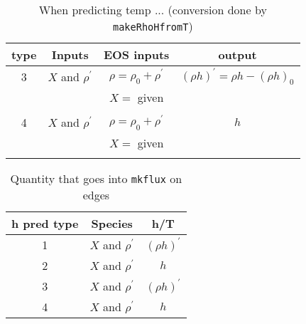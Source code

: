 \documentclass[11pt]{article}
\begin{document}
\begin{table*}
\begin{center}
\caption{When predicting temp ... (conversion done by {\tt makeRhoHfromT}) \newline}
\begin{tabular}{c|c|c|c}
\hline
\hline
{type} & {Inputs } & {EOS inputs} & {output} \\
\hline
3 & $X$ and $\rho^\prime$ & $\rho = \rho_0 + \rho^\prime$ &  $(\rho h)^\prime = \rho h - (\rho h)_0$ \\
   &                   & $   X = $ given & \\
   &                   &                 & \\
 4 & $X$ and $\rho^\prime$ & $\rho = \rho_0 + \rho^\prime$ & $h$ \\
   &                   & $   X = $ given & \\
   &                   &                 & \\
\hline
\end{tabular}
\end{center}
\end{table*}


\begin{table*}
\begin{center}
\caption{Quantity that goes into {\tt mkflux} on edges \newline}
\begin{tabular}{c|c|c}
\hline
\hline
{h pred type} & {Species } & {h/T } \\
\hline
1 & $X$ and $\rho^\prime$ & $(\rho h)^\prime$ \\
2 & $X$ and $\rho^\prime$ & $h$ \\
3 & $X$ and $\rho^\prime$ & $(\rho h)^\prime$ \\
4 & $X$ and $\rho^\prime$ & $h$ \\
\hline
\end{tabular}
\end{center}
\end{table*}
\end{document}
